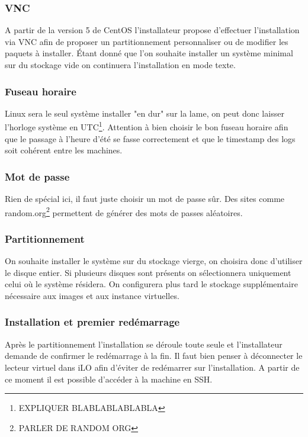 \documentclass[a4paper,oneside]{report}
\begin{document}
\subsubsection{VNC}
A partir de la version 5 de CentOS l'installateur propose d'effectuer l'installation via VNC afin de proposer un partitionnement personnaliser ou de modifier les paquets à installer.
Étant donné que l'on souhaite installer un système minimal sur du stockage vide on continuera l'installation en mode texte.

\subsubsection{Fuseau horaire}
Linux sera le seul système installer "en dur" sur la lame, on peut donc laisser l'horloge système en UTC\footnote{EXPLIQUER BLABLABLABLABLA}.
Attention à bien choisir le bon fuseau horaire afin que le passage à l'heure d'été se fasse correctement et que le timestamp des logs soit cohérent entre les machines.

\subsubsection{Mot de passe}
Rien de spécial ici, il faut juste choisir un mot de passe sûr. Des sites comme random.org\footnote{PARLER DE RANDOM ORG} permettent de générer des mots de passes aléatoires.

\subsubsection{Partitionnement}
On souhaite installer le système sur du stockage vierge, on choisira donc d'utiliser le disque entier.
Si plusieurs disques sont présents on sélectionnera uniquement celui où le système résidera.
On configurera plus tard le stockage supplémentaire nécessaire aux images et aux instance virtuelles.

\subsubsection{Installation et premier redémarrage}
Après le partitionnement l'installation se déroule toute seule et l'installateur demande de confirmer le redémarrage à la fin.
Il faut bien penser à déconnecter le lecteur virtuel dans iLO afin d'éviter de redémarrer sur l'installation.\newline
A partir de ce moment il est possible d'accéder à la machine en SSH.
\end{document}
